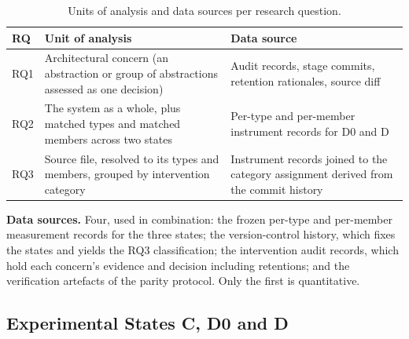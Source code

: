 \documentclass[pdflatex,sn-basic]{sn-jnl}
\begin{document}
\begin{table}[!htbp]
\centering
\caption{Units of analysis and data sources per research question.}\label{tab:units}
\small
\begin{tabular}{p{}p{}p{}}
\toprule
\textbf{RQ} & \textbf{Unit of analysis} & \textbf{Data source} \\
\midrule
RQ1 & Architectural concern (an abstraction or group of abstractions assessed as one decision) & Audit records, stage commits, retention rationales, source diff \\
\addlinespace
RQ2 & The system as a whole, plus matched types and matched members across two states & Per-type and per-member instrument records for D0 and D \\
\addlinespace
RQ3 & Source file, resolved to its types and members, grouped by intervention category & Instrument records joined to the category assignment derived from the commit history \\
\bottomrule
\end{tabular}
\end{table}

\textbf{Data sources.} Four, used in combination: the frozen per-type and per-member measurement records for the three states; the version-control history, which fixes the states and yields the RQ3 classification; the intervention audit records, which hold each concern's evidence and decision including retentions; and the verification artefacts of the parity protocol. Only the first is quantitative.

\subsection{Experimental States C, D0 and D}
\end{document}
